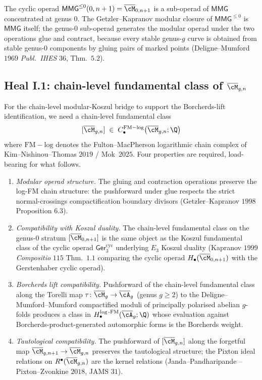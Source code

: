 The cyclic operad $\mathsf{MMG}^{\leq 0}(0, n + 1) = \overline{\cM}_{0, n + 1}$
is a sub-operad of $\mathsf{MMG}$ concentrated at genus $0$. The
Getzler--Kapranov modular closure of $\mathsf{MMG}^{\leq 0}$ is
$\mathsf{MMG}$ itself; the genus-$0$ sub-operad generates the modular
operad under the two operations $\mathrm{glue}$ and $\mathrm{contract}$,
because every stable genus-$g$ curve is obtained from stable genus-$0$
components by gluing pairs of marked points (Deligne--Mumford $1969$
\emph{Publ.~IHES} $36$, Thm.~$5.2$).

\subsection*{Heal I.1: chain-level fundamental class of $\overline{\cM}_{g, n}$}

For the chain-level modular-Koszul bridge to support the Borcherds-lift
identification, we need a chain-level fundamental class
\[
 [\overline{\cM}_{g, n}] \;\in\; C_\bullet^{\mathrm{FM-log}}
 \bigl(\overline{\cM}_{g, n}; \Q\bigr)
\]
where $\mathrm{FM-log}$ denotes the Fulton--MacPherson logarithmic
chain complex of Kim--Nishinou--Thomas $2019$ / Mok~$2025$. Four
properties are required, load-bearing for what follows.
\begin{enumerate}[label=\textup{(\roman*)}]
\item \emph{Modular operad structure.} The gluing and contraction
operations preserve the log-FM chain structure: the pushforward under
$\mathrm{glue}$ respects the strict normal-crossings compactification
boundary divisors (Getzler--Kapranov $1998$ Proposition $6.3$).
\item \emph{Compatibility with Koszul duality.} The chain-level
fundamental class on the genus-$0$ stratum
$[\overline{\cM}_{0, n + 1}]$ is the same object as the Koszul
fundamental class of the cyclic operad $\mathsf{Ger}_3^{\mathrm{cyc}}$
underlying $E_3$ Koszul duality (Kapranov $1999$ \emph{Compositio} $115$
Thm.~$1.1$ comparing the cyclic operad $H_\bullet(\overline{\cM}_{0, n + 1})$
with the Gerstenhaber cyclic operad).
\item \emph{Borcherds lift compatibility.} Pushforward of the chain-level
fundamental class along the Torelli map $\tau \colon \overline{\cM}_g \to
\overline{\cA}_g$ (genus $g \geq 2$) to the Deligne--Mumford--Mumford
compactified moduli of principally polarised abelian $g$-folds produces
a class in $H_\bullet^{\log\text{-}\mathrm{FM}}(\overline{\cA}_g; \Q)$
whose evaluation against Borcherds-product-generated automorphic forms
is the Borcherds weight.
\item \emph{Tautological compatibility.} The pushforward of
$[\overline{\cM}_{g, n}]$ along the forgetful map
$\overline{\cM}_{g, n + 1} \to \overline{\cM}_{g, n}$ preserves the
tautological structure; the Pixton ideal relations on $R^\bullet
(\overline{\cM}_{g, n})$ are the kernel relations (Janda--Pandharipande
--Pixton--Zvonkine $2018$, JAMS $31$).
\end{enumerate}

